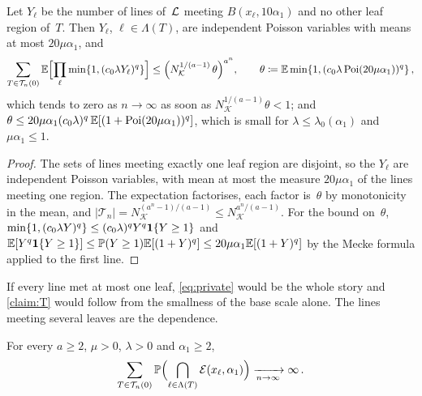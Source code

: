 \documentclass[11pt,letterpaper]{article}
\renewcommand{\cE}{\mathcal E}
\begin{document}
\begin{proposition}
\label{prop:private}
Let $Y_\ell$ be the number of lines of~$\mathcal L$ meeting $B(x_\ell,10\alpha_1)$ and no other leaf region of~$T$. Then $Y_\ell$, $\ell\in\Lambda(T)$, are independent Poisson variables with means at most $20\mu\alpha_1$, and
\begin{equation}
\label{eq:private}
  \sum_{T\in\mathcal T_n(0)}\mathbb E\Bigl[\prod_{\ell}\min\{1,(c_0\lambda Y_\ell)^q\}\Bigr]\le\Bigl(N_{\mathcal K}^{1/(a-1)}\,\theta\Bigr)^{a^n},\qquad\theta\coloneqq\mathbb E\min\{1,(c_0\lambda\,\mathrm{Poi}(20\mu\alpha_1))^q\}\,,
\end{equation}
which tends to zero as $n\to\infty$ as soon as $N_{\mathcal K}^{1/(a-1)}\theta<1$; and $\theta\le20\mu\alpha_1(c_0\lambda)^q\,\mathbb E[(1+\mathrm{Poi}(20\mu\alpha_1))^{q}]$, which is small for $\lambda\le\lambda_0(\alpha_1)$ and $\mu\alpha_1\le1$.
\end{proposition}

\begin{proof}
The sets of lines meeting exactly one leaf region are disjoint, so the $Y_\ell$ are independent Poisson variables, with mean at most the measure $20\mu\alpha_1$ of the lines meeting one region. The expectation factorises, each factor is~$\theta$ by monotonicity in the mean, and $\lvert\mathcal T_n\rvert=N_{\mathcal K}^{(a^n-1)/(a-1)}\le N_{\mathcal K}^{a^n/(a-1)}$. For the bound on~$\theta$, $\min\{1,(c_0\lambda Y)^q\}\le(c_0\lambda)^qY^q\mathbf{1}\{Y\ge1\}$ and $\mathbb E[Y^q\mathbf{1}\{Y\ge1\}]\le\mathbb P(Y\ge1)\mathbb E[(1+Y)^q]\le20\mu\alpha_1\mathbb E[(1+Y)^q]$ by the Mecke formula applied to the first line.
\end{proof}

If every line met at most one leaf, \eqref{eq:private} would be the whole story and \cref{claim:T} would follow from the smallness of the base scale alone. The lines meeting several leaves are the dependence.

\begin{proposition}
\label{prop:collinear}
For every $a\ge2$, $\mu>0$, $\lambda>0$ and $\alpha_1\ge2$,
\begin{equation}
\label{eq:diverge}
  \sum_{T\in\mathcal T_n(0)}\P\Bigl(\bigcap_{\ell\in\Lambda(T)}\cE(x_\ell,\alpha_1)\Bigr)\xrightarrow[n\to\infty]{}\infty\,.
\end{equation}
\end{proposition}
\end{document}
